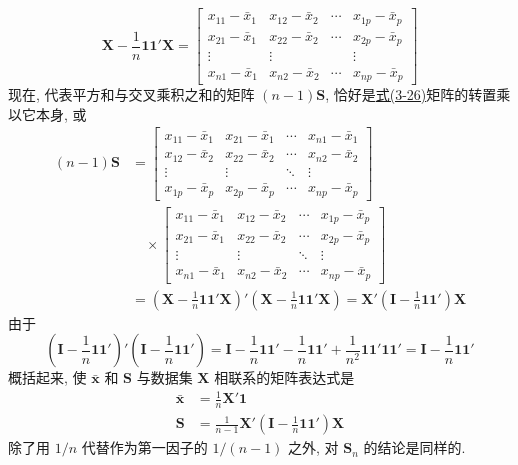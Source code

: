 
\label{eq:3-26}
\begin{equation}
\mathbf{X}-\frac{1}{n}\mathbf{1}\mathbf{1}'\mathbf{X}=\begin{bmatrix}x_{11}-\bar{x}_{1}&x_{12}-\bar{x}_{2}&\cdots&x_{1p}-\bar{x}_{p}\\x_{21}-\bar{x}_{1}&x_{22}-\bar{x}_{2}&\cdots&x_{2p}-\bar{x}_{p}\\\vdots&\vdots&&\vdots\\x_{n1}-\bar{x}_{1}&x_{n2}-\bar{x}_{2}&\cdots&x_{np}-\bar{x}_{p}\end{bmatrix} \tag{3-26}
\end{equation}
现在, 代表平方和与交叉乘积之和的矩阵 $(n-1)\mathbf{S}$, 恰好是\hyperref[eq:3-26]{式(3-26)}矩阵的转置乘以它本身, 或
\begin{align*}
(n-1)\mathbf{S}&=\begin{bmatrix}x_{11}-\bar{x}_{1}&x_{21}-\bar{x}_{1}&\cdots&x_{n1}-\bar{x}_{1}\\x_{12}-\bar{x}_{2}&x_{22}-\bar{x}_{2}&\cdots&x_{n2}-\bar{x}_{2}\\\vdots&\vdots&\ddots&\vdots\\x_{1p}-\bar{x}_{p}&x_{2p}-\bar{x}_{p}&\cdots&x_{np}-\bar{x}_{p}\end{bmatrix}\\
&\quad\times\begin{bmatrix}x_{11}-\bar{x}_{1}&x_{12}-\bar{x}_{2}&\cdots&x_{1p}-\bar{x}_{p}\\x_{21}-\bar{x}_{1}&x_{22}-\bar{x}_{2}&\cdots&x_{2p}-\bar{x}_{p}\\\vdots&\vdots&\ddots&\vdots\\x_{n1}-\bar{x}_{1}&x_{n2}-\bar{x}_{2}&\cdots&x_{np}-\bar{x}_{p}\end{bmatrix}\\
&=\left(\mathbf{X}-\frac{1}{n}\mathbf{1}\mathbf{1}'\mathbf{X}\right)'\left(\mathbf{X}-\frac{1}{n}\mathbf{1}\mathbf{1}'\mathbf{X}\right)=\mathbf{X}'\left(\mathbf{I}-\frac{1}{n}\mathbf{1}\mathbf{1}'\right)\mathbf{X}
\end{align*}
由于
\[
\left(\mathbf{I}-\frac{1}{n}\mathbf{1}\mathbf{1}'\right)'\left(\mathbf{I}-\frac{1}{n}\mathbf{1}\mathbf{1}'\right)=\mathbf{I}-\frac{1}{n}\mathbf{1}\mathbf{1}'-\frac{1}{n}\mathbf{1}\mathbf{1}'+\frac{1}{n^{2}}\mathbf{1}\mathbf{1}'\mathbf{1}\mathbf{1}'=\mathbf{I}-\frac{1}{n}\mathbf{1}\mathbf{1}'
\]
概括起来, 使 $\bar{\mathbf{x}}$ 和 $\mathbf{S}$ 与数据集 $\mathbf{X}$ 相联系的矩阵表达式是
\label{eq:3-27}
\begin{equation}
\begin{aligned}
\bar{\mathbf{x}}&=\frac{1}{n}\mathbf{X}'\mathbf{1}\\
\mathbf{S}&=\frac{1}{n-1}\mathbf{X}'\left(\mathbf{I}-\frac{1}{n}\mathbf{1}\mathbf{1}'\right)\mathbf{X}
\end{aligned} \tag{3-27}
\end{equation}
除了用 $1/n$ 代替作为第一因子的 $1/(n-1)$ 之外, 对 $\mathbf{S}_{n}$ 的结论是同样的.

